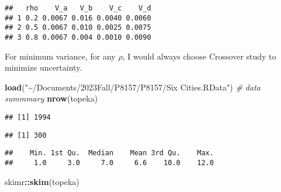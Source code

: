 \documentclass[
]{article}
\newenvironment{Shaded}{\begin{snugshade}}{\end{snugshade}}
\newcommand{\CommentTok}[1]{\textcolor[rgb]{0.56,0.35,0.01}{\textit{#1}}}
\newcommand{\FunctionTok}[1]{\textcolor[rgb]{0.13,0.29,0.53}{\textbf{#1}}}
\newcommand{\NormalTok}[1]{#1}
\newcommand{\OtherTok}[1]{\textcolor[rgb]{0.56,0.35,0.01}{#1}}
\newcommand{\SpecialCharTok}[1]{\textcolor[rgb]{0.81,0.36,0.00}{\textbf{#1}}}
\newcommand{\StringTok}[1]{\textcolor[rgb]{0.31,0.60,0.02}{#1}}
\begin{document}
\begin{verbatim}
##   rho    V_a   V_b    V_c    V_d
## 1 0.2 0.0067 0.016 0.0040 0.0060
## 2 0.5 0.0067 0.010 0.0025 0.0075
## 3 0.8 0.0067 0.004 0.0010 0.0090
\end{verbatim}

For minimum variance, for any \(\rho\), I would always choose Crossover
study to minimize uncertainty.

\begin{Shaded}
\begin{Highlighting}[]
\FunctionTok{load}\NormalTok{(}\StringTok{"\textasciitilde{}/Documents/2023Fall/P8157/P8157/Six Cities.RData"}\NormalTok{)}
\CommentTok{\# data summmary}
\FunctionTok{nrow}\NormalTok{(topeka)}
\end{Highlighting}
\end{Shaded}

\begin{verbatim}
## [1] 1994
\end{verbatim}

\begin{Shaded}
\end{Shaded}

\begin{verbatim}
## [1] 300
\end{verbatim}

\begin{Shaded}
\end{Shaded}

\begin{verbatim}
##    Min. 1st Qu.  Median    Mean 3rd Qu.    Max. 
##     1.0     3.0     7.0     6.6    10.0    12.0
\end{verbatim}

\begin{Shaded}
\begin{Highlighting}[]
\NormalTok{skimr}\SpecialCharTok{::}\FunctionTok{skim}\NormalTok{(topeka)}
\end{Highlighting}
\end{Shaded}
\end{document}
